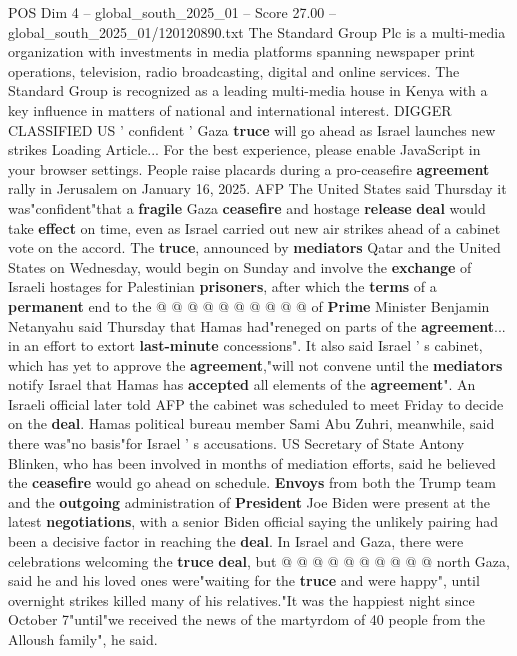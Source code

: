 \begin{textsample}{POS Dim 4 – global\_south\_2025\_01 – Score 27.00 – global\_south\_2025\_01/120120890.txt}  \label{ex:f4_pos_008}
The Standard Group Plc is a multi-media organization with investments in media platforms spanning newspaper print operations, television, radio broadcasting, digital and online services.
The Standard Group is recognized as a leading multi-media house in Kenya with a key influence in matters of national and international interest.
DIGGER CLASSIFIED US ' confident ' Gaza \textbf{truce} will go ahead as Israel launches new strikes Loading Article...
For the best experience, please enable JavaScript in your browser settings.
People raise placards during a pro-ceasefire \textbf{agreement} rally in Jerusalem on January 16, 2025.
AFP The United States said Thursday it was"confident"that a \textbf{fragile} Gaza \textbf{ceasefire} and hostage \textbf{release} \textbf{deal} would take \textbf{effect} on time, even as Israel carried out new air strikes ahead of a cabinet vote on the accord.
The \textbf{truce}, announced by \textbf{mediators} Qatar and the United States on Wednesday, would begin on Sunday and involve the \textbf{exchange} of Israeli hostages for Palestinian \textbf{prisoners}, after which the \textbf{terms} of a \textbf{permanent} end to the @ @ @ @ @ @ @ @ @ @ of \textbf{Prime} Minister Benjamin Netanyahu said Thursday that Hamas had"reneged on parts of the \textbf{agreement}... in an effort to extort \textbf{last-minute} concessions".
It also said Israel ' s cabinet, which has yet to approve the \textbf{agreement},"will not convene until the \textbf{mediators} notify Israel that Hamas has \textbf{accepted} all elements of the \textbf{agreement}".
An Israeli official later told AFP the cabinet was scheduled to meet Friday to decide on the \textbf{deal}.
Hamas political bureau member Sami Abu Zuhri, meanwhile, said there was"no basis"for Israel ' s accusations.
US Secretary of State Antony Blinken, who has been involved in months of mediation efforts, said he believed the \textbf{ceasefire} would go ahead on schedule. \textbf{Envoys} from both the Trump team and the \textbf{outgoing} administration of \textbf{President} Joe Biden were present at the latest \textbf{negotiations}, with a senior Biden official saying the unlikely pairing had been a decisive factor in reaching the \textbf{deal}.
In Israel and Gaza, there were celebrations welcoming the \textbf{truce} \textbf{deal}, but @ @ @ @ @ @ @ @ @ @ north Gaza, said he and his loved ones were"waiting for the \textbf{truce} and were happy", until overnight strikes killed many of his relatives."It was the happiest night since October 7"until"we received the news of the martyrdom of 40 people from the Alloush family", he said.

\end{textsample}

